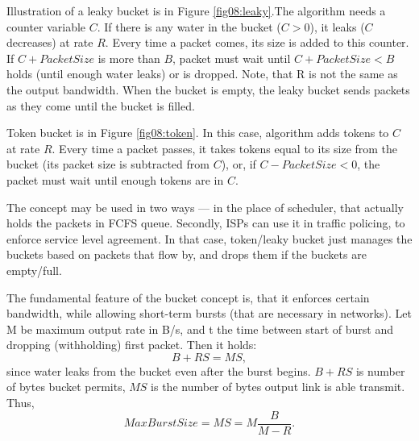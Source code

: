 Illustration of a leaky bucket is in Figure \ref{fig08:leaky}.The algorithm needs a counter variable $C$. If there is any water in the bucket ($C > 0$), it leaks ($C$ decreases) at rate $R$. Every time a packet comes, its size is added to this counter. If $C + PacketSize$ is more than $B$, packet must wait until $C + PacketSize < B$ holds (until enough water leaks) or is dropped. Note, that R is not the same as the output bandwidth. When the bucket is empty, the leaky bucket sends packets as they come until the bucket is filled. 

Token bucket is in Figure \ref{fig08:token}. In this case, algorithm adds tokens to $C$ at rate $R$. Every time a packet passes, it takes tokens equal to its size from the bucket (its packet size is subtracted from $C$), or, if $C - PacketSize < 0$, the packet must wait until enough tokens are in $C$. 

The concept may be used in two ways --- in the place of scheduler, that actually holds the packets in FCFS queue. Secondly, ISPs can use it in traffic policing, to enforce service level agreement. In that case, token/leaky bucket just manages the buckets based on packets that flow by, and drops them if the buckets are empty/full.

The fundamental feature of the bucket concept is, that it enforces certain bandwidth, while allowing short-term bursts (that are necessary in networks). Let M be maximum output rate in B/s, and t the time between start of burst and dropping (withholding) first packet. Then it holds:
\[
	B + RS = MS,
\]
since water leaks from the bucket even after the burst begins. $B + RS$ is number of bytes bucket permits, $MS$ is the number of bytes output link is able transmit. Thus,
\[
	MaxBurstSize = MS = M\frac{B}{M - R}.
\]

